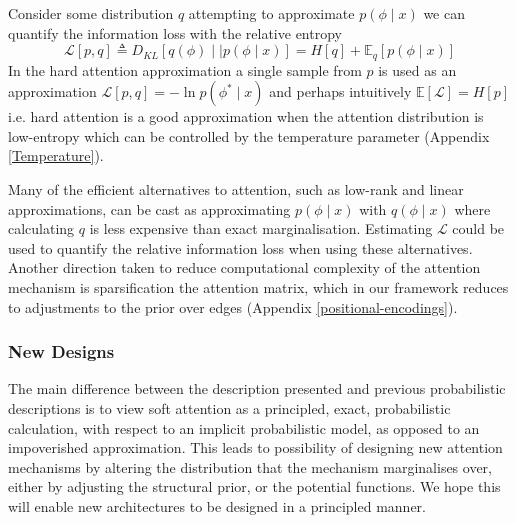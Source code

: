 \documentclass{article}
\theoremstyle{plain}
\theoremstyle{definition}
\theoremstyle{remark}
\begin{document}
Consider some distribution $q$ attempting to approximate $p(\phi \mid x)$ we can quantify the information loss with the relative entropy 
$$\mathcal{L}[p,q] \triangleq D_{KL}[q(\phi) \mid \mid p(\phi \mid x)] = H[q] + \mathbb{E}_q[p(\phi \mid x)]$$
In the hard attention approximation a single sample from $p$ is used as an approximation $\mathcal{L}[p,q] = -\ln p(\phi^* \mid x)$ and perhaps intuitively $\mathbb{E}[\mathcal{L}] = H[p]$ i.e. hard attention is a good approximation when the attention distribution is low-entropy which can be controlled by the temperature parameter (Appendix \ref{Temperature}).

Many of the efficient alternatives to attention, such as low-rank and linear approximations, can be cast as approximating $p(\phi \mid x)$ with $q(\phi \mid x)$ where calculating $q$ is less expensive than exact marginalisation. Estimating $\mathcal{L}$ could be used to quantify the relative information loss when using these alternatives. Another direction taken to reduce computational complexity of the attention mechanism is sparsification the attention matrix, which in our framework reduces to adjustments to the prior over edges (Appendix \ref{positional-encodings}).

\subsubsection{New Designs}

The main difference between the description presented and previous probabilistic descriptions is to view soft attention as a principled, exact, probabilistic calculation, with respect to an implicit probabilistic model, as opposed to an impoverished approximation. This leads to possibility of designing new attention mechanisms by altering the distribution that the mechanism marginalises over, either by adjusting the structural prior, or the potential functions. We hope this will enable new architectures to be designed in a principled manner. 



\end{document}
